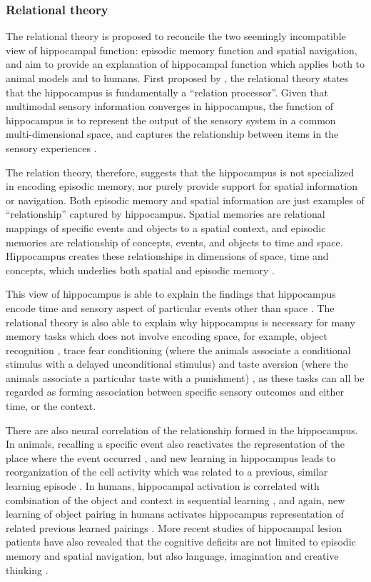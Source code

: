 \subsubsection{Relational theory}

The relational theory is proposed to reconcile the two seemingly incompatible view of hippocampal function: episodic memory function and spatial navigation, and aim to provide an explanation of hippocampal function which applies both to animal models and to humans. First proposed by \citet{eichenbaum93}, the relational theory states that the hippocampus is fundamentally a ``relation processor''. Given that multimodal sensory information converges in hippocampus, the function of hippocampus is to represent the output of the sensory system in a common multi-dimensional space, and captures the relationship between items in the sensory experiences \citep{eichenbaum93}.

The relation theory, therefore, suggests that the hippocampus is not specialized in encoding episodic memory, nor purely provide support for spatial information or navigation. Both episodic memory and spatial information are just examples of ``relationship'' captured by hippocampus. Spatial memories are relational mappings of specific events and objects to a spatial context, and episodic memories are relationship of concepts, events, and objects to time and space. Hippocampus creates these relationships in dimensions of space, time and concepts, which underlies both spatial and episodic memory \citep{
eichenbaum14}.

This view of hippocampus is able to explain the findings that hippocampus encode time and sensory aspect of particular events other than space \citep{hampson93, young94, wood99, moser08}. The relational theory is also able to explain why hippocampus is necessary for many memory tasks which does not involve encoding space, for example, object recognition \citep{eacott04, langston10}, trace fear conditioning (where the animals associate a conditional stimulus with a delayed unconditional stimulus) \citep{crestani02, mcechron98} and taste aversion (where the animals associate a particular taste with a punishment) \citep{best73, gallo95}, as these tasks can all be regarded as forming association between specific sensory outcomes and either time, or the context. 

There are also neural correlation of the relationship formed in the hippocampus. In animals, recalling a specific event also reactivates the representation of the place where the event occurred \citep{moita03, itskov11}, and new learning in hippocampus leads to reorganization of the cell activity which was related to a previous, similar learning episode \citep{mckenzie13}. In humans, hippocampal activation is correlated with combination of the object and context in sequential learning \citep{hsieh14}, and again, new learning of object pairing in humans activates hippocampus representation of related previous learned pairings \citep{zeithamova12}. More recent studies of hippocampal lesion patients have also revealed that the cognitive deficits are not limited to episodic memory and spatial navigation, but also language, imagination and creative thinking \citep{duff09, duff13}.


